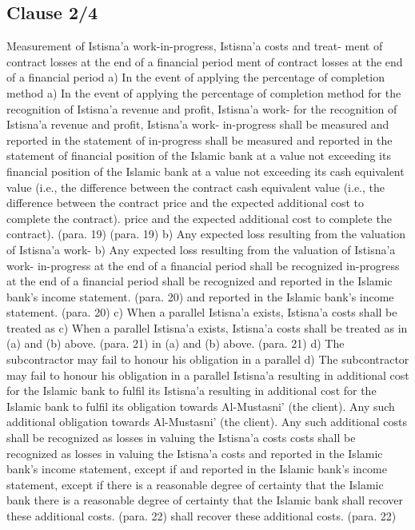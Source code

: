 \documentclass{article}%
\begin{document}
%
\subsection{Clause 2/4}%
\label{subsec:Clause2/4}%
Measurement of Istisna’a work-in-progress, Istisna’a costs and treat- ment of contract losses at the end of a financial period ment of contract losses at the end of a financial period a) In the event of applying the percentage of completion method  a) In the event of applying the percentage of completion method  for the recognition of Istisna’a revenue and profit, Istisna’a work- for the recognition of Istisna’a revenue and profit, Istisna’a work- in-progress shall be measured and reported in the statement of  in-progress shall be measured and reported in the statement of  financial position of the Islamic bank at a value not exceeding its  financial position of the Islamic bank at a value not exceeding its  cash equivalent value (i.e., the difference between the contract  cash equivalent value (i.e., the difference between the contract  price and the expected additional cost to complete the contract).  price and the expected additional cost to complete the contract).  (para. 19) (para. 19) b) Any expected loss resulting from the valuation of Istisna’a work- b) Any expected loss resulting from the valuation of Istisna’a work- in-progress at the end of a financial period shall be recognized  in-progress at the end of a financial period shall be recognized  and reported in the Islamic bank’s income statement. (para. 20) and reported in the Islamic bank’s income statement. (para. 20) c) When a parallel Istisna’a exists, Istisna’a costs shall be treated as  c) When a parallel Istisna’a exists, Istisna’a costs shall be treated as  in (a) and (b) above. (para. 21) in (a) and (b) above. (para. 21) d) The subcontractor may fail to honour his obligation in a parallel  d) The subcontractor may fail to honour his obligation in a parallel  Istisna’a resulting in additional cost for the Islamic bank to fulfil its  Istisna’a resulting in additional cost for the Islamic bank to fulfil its  obligation towards Al-Mustasni’ (the client). Any such additional  obligation towards Al-Mustasni’ (the client). Any such additional  costs shall be recognized as losses in valuing the Istisna’a costs  costs shall be recognized as losses in valuing the Istisna’a costs  and reported in the Islamic bank’s income statement, except if  and reported in the Islamic bank’s income statement, except if  there is a reasonable degree of certainty that the Islamic bank  there is a reasonable degree of certainty that the Islamic bank  shall recover these additional costs. (para. 22) shall recover these additional costs. (para. 22)
\end{document}

